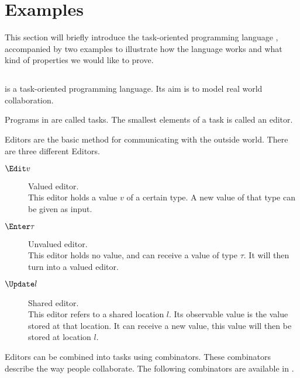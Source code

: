 

\section{Examples}
\label{sec:examples}

This section will briefly introduce the task-oriented programming language \TOPHAT,
accompanied by two examples to illustrate how the language works and what kind of properties we would like to prove.

\subsection{\TOPHAT}

\TOPHAT is a task-oriented programming language.
Its aim is to model real world collaboration.

Programs in \TOPHAT are called tasks.
The smallest elements of a task is called an editor.

Editors are the basic method for communicating with the outside world.
There are three different Editors.
\begin{description}
  \item[$\Edit v$] Valued editor.\\
    This editor holds a value $v$ of a certain type.
    A new value of that type can be given as input.
  \item[$\Enter \tau$] Unvalued editor.\\
    This editor holds no value, and can receive a value of type $\tau$.
    It will then turn into a valued editor.
  \item[$\Update l$] Shared editor.\\
    This editor refers to a shared location $l$.
    Its observable value is the value stored at that location.
    It can receive a new value, this value will then be stored at location $l$.
\end{description}

Editors can be combined into tasks using combinators.
These combinators describe the way people collaborate.
The following combinators are available in \TOPHAT.

